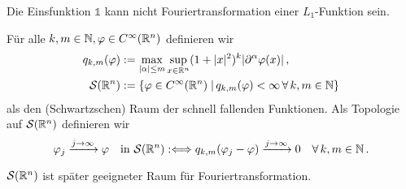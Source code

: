 \begin{bem*}
  Die Einsfunktion $\mathds{1}$ kann nicht Fouriertransformation einer $L_1$-Funktion sein.
\end{bem*}

\begin{defi}
Für alle $k,m\in \mathbb{N}, \varphi\in C^\infty(\mathbb{R}^n)$ definieren wir
\begin{align*}
q_{k,m} (\varphi) &:= \max_{\lvert \alpha\rvert \leq m} \sup_{x \in \mathbb{R}^n} (1+\lvert x\rvert^2)^k \lvert \partial^\alpha \varphi (x)\rvert \, , \\
\mathcal S (\mathbb{R}^n)& := \{\varphi \in C^\infty (\mathbb{R}^n) \;\vert\, q_{k,m} (\varphi) < \infty \, \forall \, k,m \in \mathbb{N}\}
\end{align*}
als den (Schwartzschen) Raum  der schnell fallenden Funktionen. Als Topologie auf $\mathcal S(\mathbb{R}^n)$ definieren wir
\[
	\varphi_j \xrightarrow{j\rightarrow \infty} \varphi \quad \text{in } \mathcal S(\mathbb{R}^n) : \Longleftrightarrow q_{k,m} (\varphi_j - \varphi) \xrightarrow{j\rightarrow \infty} 0 \quad \forall \, k,m\in \mathbb{N} \, .
\]	
\end{defi}

\begin{bem*}
$\mathcal S(\mathbb{R}^n)$ ist später  geeigneter Raum für Fouriertransformation.
\end{bem*}

